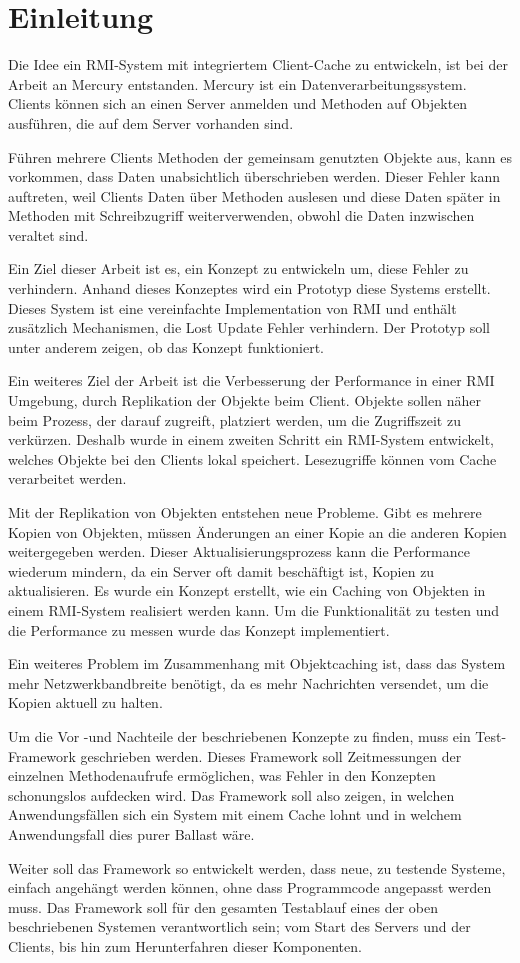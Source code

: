 \chapter{Einleitung}

Die Idee ein RMI-System mit integriertem Client-Cache zu entwickeln, ist bei der Arbeit an Mercury entstanden. Mercury ist ein Datenverarbeitungssystem. Clients können sich an einen Server anmelden und Methoden auf Objekten ausführen, die auf dem Server vorhanden sind. 

Führen mehrere Clients Methoden der gemeinsam genutzten Objekte aus, kann es vorkommen, dass Daten unabsichtlich überschrieben werden. Dieser Fehler kann auftreten, weil Clients Daten über Methoden auslesen und diese Daten später in Methoden mit Schreibzugriff weiterverwenden, obwohl die Daten inzwischen veraltet sind.

Ein Ziel dieser Arbeit ist es, ein Konzept zu entwickeln um, diese Fehler zu verhindern. Anhand dieses Konzeptes wird ein Prototyp diese Systems erstellt. Dieses System ist eine vereinfachte Implementation von RMI und enthält zusätzlich Mechanismen, die Lost Update Fehler verhindern. Der Prototyp soll unter anderem zeigen, ob das Konzept funktioniert. 

Ein weiteres Ziel der Arbeit ist die Verbesserung der Performance in einer RMI Umgebung, durch Replikation der Objekte beim Client. Objekte sollen näher beim Prozess, der darauf zugreift, platziert werden, um die Zugriffszeit zu verkürzen. Deshalb wurde in einem zweiten Schritt ein RMI-System entwickelt, welches Objekte bei den Clients lokal speichert. Lesezugriffe können vom Cache verarbeitet werden.

Mit der Replikation von Objekten entstehen neue Probleme. Gibt es mehrere Kopien von Objekten, müssen Änderungen an einer Kopie an die anderen Kopien weitergegeben werden. Dieser Aktualisierungsprozess kann die Performance wiederum mindern, da ein Server oft damit beschäftigt ist, Kopien zu aktualisieren. Es wurde ein Konzept erstellt, wie ein Caching von Objekten in einem RMI-System realisiert werden kann. Um die Funktionalität zu testen und die Performance zu messen wurde das Konzept implementiert. 

Ein weiteres Problem im Zusammenhang mit Objektcaching ist, dass das System mehr Netzwerkbandbreite benötigt, da es mehr Nachrichten versendet, um die Kopien aktuell zu halten.

Um die Vor -und Nachteile der beschriebenen Konzepte zu finden, muss ein Test-Framework geschrieben werden. Dieses Framework soll Zeitmessungen der einzelnen Methodenaufrufe ermöglichen, was Fehler in den Konzepten schonungslos aufdecken wird. Das Framework soll also zeigen, in welchen Anwendungsfällen sich ein System mit einem Cache lohnt und in welchem Anwendungsfall dies purer Ballast wäre.

Weiter soll das Framework so entwickelt werden, dass neue, zu testende Systeme, einfach angehängt werden können, ohne dass Programmcode angepasst werden muss. Das Framework soll für den gesamten Testablauf eines der oben beschriebenen Systemen verantwortlich sein; vom Start des Servers und der Clients, bis hin zum Herunterfahren dieser Komponenten.

